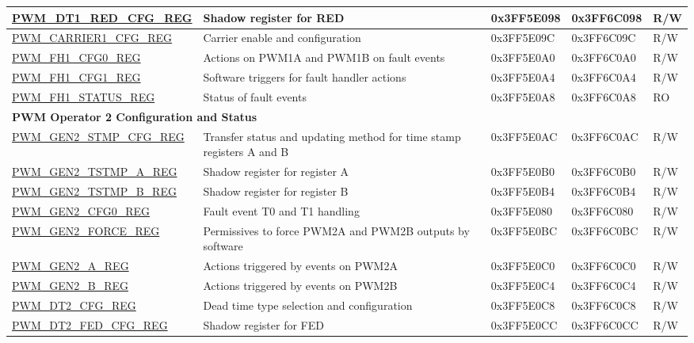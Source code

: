 \begin{longtable}{ | p{5.5cm} | p{5.7cm} | p{2cm} | p{2cm} | p{0.8cm} | }
\hyperref[regdesc:PWMDT1REDCFGREG]{PWM\_DT1\_RED\_CFG\_REG} & Shadow register for RED & 0x3FF5E098 & 0x3FF6C098 & R/W \\ \hline
\hyperref[regdesc:PWMCARRIER1CFGREG]{PWM\_CARRIER1\_CFG\_REG} & Carrier enable and configuration & 0x3FF5E09C & 0x3FF6C09C & R/W \\ \hline
\hyperref[regdesc:PWMFH1CFG0REG]{PWM\_FH1\_CFG0\_REG} & Actions on PWM1A and PWM1B on fault events & 0x3FF5E0A0 & 0x3FF6C0A0 & R/W \\ \hline
\hyperref[regdesc:PWMFH1CFG1REG]{PWM\_FH1\_CFG1\_REG} & Software triggers for fault handler actions & 0x3FF5E0A4 & 0x3FF6C0A4 & R/W \\ \hline
\hyperref[regdesc:PWMFH1STATUSREG]{PWM\_FH1\_STATUS\_REG} & Status of fault events & 0x3FF5E0A8 & 0x3FF6C0A8 & RO \\ \hline
\multicolumn{5}{|l|}{\textbf{PWM Operator 2 Configuration and Status}} \\ \hline
\hyperref[regdesc:PWMGEN2STMPCFGREG]{PWM\_GEN2\_STMP\_CFG\_REG} & Transfer status and updating method for time stamp registers A and B & 0x3FF5E0AC & 0x3FF6C0AC & R/W \\ \hline
\hyperref[regdesc:PWMGEN2TSTMPAREG]{PWM\_GEN2\_TSTMP\_A\_REG} & Shadow register for register A & 0x3FF5E0B0 & 0x3FF6C0B0 & R/W \\ \hline
\hyperref[regdesc:PWMGEN2TSTMPBREG]{PWM\_GEN2\_TSTMP\_B\_REG} & Shadow register for register B & 0x3FF5E0B4 & 0x3FF6C0B4 & R/W \\ \hline
\hyperref[regdesc:PWMGEN2CFG0REG]{PWM\_GEN2\_CFG0\_REG} & Fault event T0 and T1 handling & 0x3FF5E080 & 0x3FF6C080 & R/W \\ \hline
\hyperref[regdesc:PWMGEN2FORCEREG]{PWM\_GEN2\_FORCE\_REG} & Permissives to force PWM2A and PWM2B outputs by software & 0x3FF5E0BC & 0x3FF6C0BC & R/W \\ \hline
\hyperref[regdesc:PWMGEN2AREG]{PWM\_GEN2\_A\_REG} & Actions triggered by events on PWM2A & 0x3FF5E0C0 & 0x3FF6C0C0 & R/W \\ \hline
\hyperref[regdesc:PWMGEN2BREG]{PWM\_GEN2\_B\_REG} & Actions triggered by events on PWM2B & 0x3FF5E0C4 & 0x3FF6C0C4 & R/W \\ \hline
\hyperref[regdesc:PWMDT2CFGREG]{PWM\_DT2\_CFG\_REG} & Dead time type selection and configuration & 0x3FF5E0C8 & 0x3FF6C0C8 & R/W \\ \hline
\hyperref[regdesc:PWMDT2FEDCFGREG]{PWM\_DT2\_FED\_CFG\_REG} & Shadow register for FED & 0x3FF5E0CC & 0x3FF6C0CC & R/W \\ \hline

\end{longtable}
